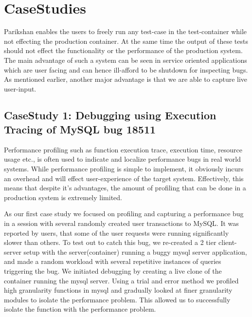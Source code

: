 \section{CaseStudies}
\label{sec:casestudy}

Parikshan enables the users to freely run any test-case in the test-container while not effecting the production container. 
At the same time the output of these tests should not effect the functionality or the performance of the production system.
The main advantage of such a system can be seen in service oriented applications which are user facing and can hence ill-afford to be shutdown for inspecting bugs.
As mentioned earlier, another major advantage is that we are able to capture live user-input. \\

\subsection{CaseStudy 1: Debugging using Execution Tracing of MySQL bug 18511}  
Performance profiling such as function execution trace, execution time, resource usage etc., is often used to indicate and localize performance bugs in real world systems. 
While performance profiling is simple to implement, it obviously incurs an overhead and will effect user-experience of the target system.
Effectively, this means that despite it's advantages, the amount of profiling that can be done in a production system is extremely limited. 

As our first case study we focused on profiling and capturing a performance bug in a session with several randomly created user transactions to MySQL. 
It was reported by users, that some of the user requests were running significantly slower than others.
To test out \parikshan to catch this bug, we re-created a 2 tier client-server setup with the server(container) running a buggy mysql server application, and made a random workload with several repetitive instances of queries triggering the bug.
We initiated debugging by creating a live clone of the container running the mysql server.
Using a trial and error method we profiled high granularity functions in mysql and gradually looked at finer granularity modules to isolate the performance problem.
This allowed us to successfully isolate the function with the performance problem.

